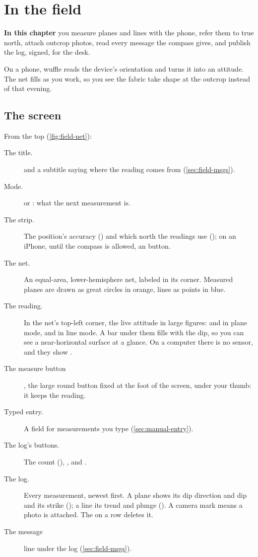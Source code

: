 \chapter{In the field}\label{ch:field}
\begin{goals}
\textbf{In this chapter} you measure planes and lines with the phone, refer them to true north, attach
outcrop photos, read every message the compass gives, and publish the log, signed, for the desk.
\end{goals}

On a phone, wuffle reads the device's orientation and turns it into an attitude. The net fills as you
work, so you see the fabric take shape at the outcrop instead of that evening.

\section{The screen}\label{sec:field-screen}

From the top (\cref{fig:field-net}):

\begin{description}
\item[The title.]  and a subtitle saying where the reading comes from (\cref{sec:field-msgs}).
\item[Mode.]  or : what the next measurement is.
\item[The strip.] The position's accuracy () and which north the readings use
(); on an iPhone, until the compass is allowed, an  button.
\item[The net.] An equal-area, lower-hemisphere net, labeled  in its corner.
Measured planes are drawn as great circles in orange, lines as points in blue.
\item[The reading.] In the net's top-left corner, the live attitude in large figures:  and
 in plane mode,  and  in line mode. A bar under them fills with the dip, so
you can see a near-horizontal surface at a glance. On a computer there is no sensor, and they show
.
\item[The measure button] , the large round button fixed at the foot of the screen, under your
thumb: it keeps the reading.
\item[Typed entry.] A field for measurements you type (\cref{sec:manual-entry}).
\item[The log's buttons.] The count (), ,  and .
\item[The log.] Every measurement, newest first. A plane shows its dip direction and dip and its strike
(); a line its trend and plunge (). A camera mark means a
photo is attached. The  on a row deletes it.
\item[The message] line under the log (\cref{sec:field-msgs}).
\end{description}


